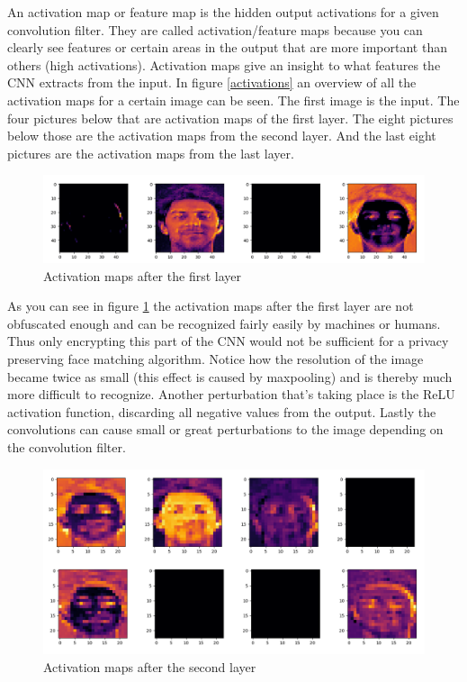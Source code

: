 An activation map or feature map is the hidden output activations for a given convolution filter. They are called activation/feature maps because you can clearly see features or certain areas in the output that are more important than others (high activations). Activation maps give an insight to what features the CNN extracts from the input. In figure \ref{activations} an overview of all the activation maps for a certain image can be seen. The first image is the input. The four pictures below that are activation maps of the first layer. The eight pictures below those are the activation maps from the second layer. And the last eight pictures are the activation maps from the last layer.

\begin{figure}[H]
  \includegraphics[scale=0.4]{fig/activations/7_1.png}
  \centering
  \caption{Activation maps after the first layer}
  \label{fig:activation_1}
\end{figure}

As you can see in figure \ref{fig:activation_1} the activation maps after the first layer are not obfuscated enough and can be recognized fairly easily by machines or humans. Thus only encrypting this part of the CNN would not be sufficient for a privacy preserving face matching algorithm. Notice how the resolution of the image became twice as small (this effect is caused by maxpooling) and is thereby much more difficult to recognize. Another perturbation that's taking place is the ReLU activation function, discarding all negative values from the output. Lastly the convolutions can cause small or great perturbations to the image depending on the convolution filter.

\begin{figure}[H]
  \includegraphics[scale=0.4]{fig/activations/7_2.png}
  \centering
  \caption{Activation maps after the second layer}
  \label{fig:activation_2}
\end{figure}

